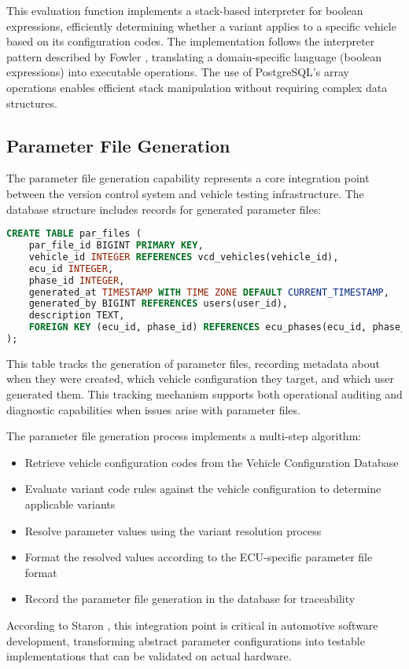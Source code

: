 This evaluation function implements a stack-based interpreter for boolean expressions, efficiently determining whether a variant applies to a specific vehicle based on its configuration codes. The implementation follows the interpreter pattern described by Fowler \cite{fowler2003patterns}, translating a domain-specific language (boolean expressions) into executable operations. The use of PostgreSQL's array operations enables efficient stack manipulation without requiring complex data structures.

\subsection{Parameter File Generation}
\label{subsec:parameter-file-generation}

The parameter file generation capability represents a core integration point between the version control system and vehicle testing infrastructure. The database structure includes records for generated parameter files:

\begin{lstlisting}[language=SQL, caption={Parameter File Records}, label={lst:par-file-records}]
CREATE TABLE par_files (
    par_file_id BIGINT PRIMARY KEY,
    vehicle_id INTEGER REFERENCES vcd_vehicles(vehicle_id),
    ecu_id INTEGER,
    phase_id INTEGER,
    generated_at TIMESTAMP WITH TIME ZONE DEFAULT CURRENT_TIMESTAMP,
    generated_by BIGINT REFERENCES users(user_id),
    description TEXT,
    FOREIGN KEY (ecu_id, phase_id) REFERENCES ecu_phases(ecu_id, phase_id)
);
\end{lstlisting}

This table tracks the generation of parameter files, recording metadata about when they were created, which vehicle configuration they target, and which user generated them. This tracking mechanism supports both operational auditing and diagnostic capabilities when issues arise with parameter files.

The parameter file generation process implements a multi-step algorithm:

\begin{itemize}
  \item Retrieve vehicle configuration codes from the Vehicle Configuration Database
  \item Evaluate variant code rules against the vehicle configuration to determine applicable variants
  \item Resolve parameter values using the variant resolution process
  \item Format the resolved values according to the \ac{ECU}-specific parameter file format
  \item Record the parameter file generation in the database for traceability
\end{itemize}

According to Staron \cite{staron2021automotive}, this integration point is critical in automotive software development, transforming abstract parameter configurations into testable implementations that can be validated on actual hardware.
